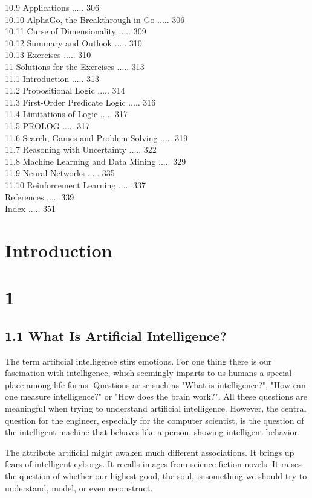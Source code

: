 \documentclass[10pt]{article}
\begin{document}
10.9 Applications ..... 306\\
10.10 AlphaGo, the Breakthrough in Go ..... 306\\
10.11 Curse of Dimensionality ..... 309\\
10.12 Summary and Outlook ..... 310\\
10.13 Exercises ..... 310\\
11 Solutions for the Exercises ..... 313\\
11.1 Introduction ..... 313\\
11.2 Propositional Logic ..... 314\\
11.3 First-Order Predicate Logic ..... 316\\
11.4 Limitations of Logic ..... 317\\
11.5 PROLOG ..... 317\\
11.6 Search, Games and Problem Solving ..... 319\\
11.7 Reasoning with Uncertainty ..... 322\\
11.8 Machine Learning and Data Mining ..... 329\\
11.9 Neural Networks ..... 335\\
11.10 Reinforcement Learning ..... 337\\
References ..... 339\\
Index ..... 351

\section*{Introduction}
\section*{1}
\subsection*{1.1 What Is Artificial Intelligence?}
The term artificial intelligence stirs emotions. For one thing there is our fascination with intelligence, which seemingly imparts to us humans a special place among life forms. Questions arise such as "What is intelligence?", "How can one measure intelligence?" or "How does the brain work?". All these questions are meaningful when trying to understand artificial intelligence. However, the central question for the engineer, especially for the computer scientist, is the question of the intelligent machine that behaves like a person, showing intelligent behavior.

The attribute artificial might awaken much different associations. It brings up fears of intelligent cyborgs. It recalls images from science fiction novels. It raises the question of whether our highest good, the soul, is something we should try to understand, model, or even reconstruct.
\end{document}

